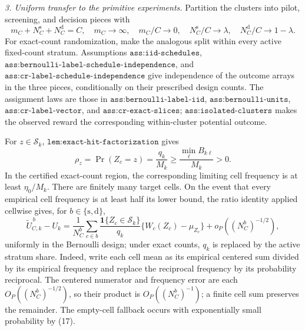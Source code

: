 \emph{3. Uniform transfer to the primitive experiments.}
Partition the clusters into pilot, screening, and decision pieces with
\[
m_C+N_C^{\mathrm s}+N_C^{\mathrm d}=C,
\quad m_C\to\infty,
\quad m_C/C\to0,
\quad N_C^{\mathrm s}/C\to\lambda,
\quad N_C^{\mathrm d}/C\to1-\lambda.                              \tag{16}
\]
For exact-count randomization, make the analogous split within every active fixed-count stratum.  Assumptions \(\texttt{ass:iid-schedules}\), \(\texttt{ass:bernoulli-label-schedule-independence}\), and \(\texttt{ass:cr-label-schedule-independence}\) give independence of the outcome arrays in the three pieces, conditionally on their prescribed design counts.  The assignment laws are those in \(\texttt{ass:bernoulli-label-iid}\), \(\texttt{ass:bernoulli-units}\), \(\texttt{ass:cr-label-vector}\), and \(\texttt{ass:cr-exact-slices}\); \(\texttt{ass:isolated-clusters}\) makes the observed reward the corresponding within-cluster potential outcome.

For \(z\in\mathcal S_k\), \(\texttt{lem:exact-hit-factorization}\) gives
\[
\rho_z=\Pr(Z_c=z)=\frac{q_k}{M_k}
\geq\frac{\min_\ell B_{k\ell}}{M_k}>0.                           \tag{17}
\]
In the certified exact-count region, the corresponding limiting cell frequency is at least \(\eta_0/M_k\).  There are finitely many target cells.  On the event that every empirical cell frequency is at least half its lower bound, the ratio identity applied cellwise gives, for \(b\in\{\mathrm s,\mathrm d\}\),
\[
\widetilde U_{C,k}^{\,b}-U_k
=\frac1{N_C^b}\sum_{c\in b}
\frac{\mathbf1\{Z_c\in\mathcal S_k\}}{q_k}
\{W_c(Z_c)-\mu_{Z_c}\}+o_P((N_C^b)^{-1/2}),                     \tag{18}
\]
uniformly in the Bernoulli design; under exact counts, \(q_k\) is replaced by the active stratum share.  Indeed, write each cell mean as its empirical centered sum divided by its empirical frequency and replace the reciprocal frequency by its probability reciprocal.  The centered numerator and frequency error are each \(O_P((N_C^b)^{-1/2})\), so their product is \(O_P((N_C^b)^{-1})\); a finite cell sum preserves the remainder.  The empty-cell fallback occurs with exponentially small probability by (17).

